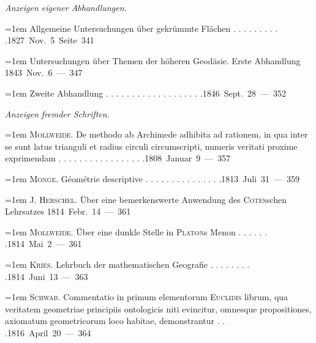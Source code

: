 \par{}%
\begingroup\fontsize{10.5}{13}\selectfont{}
\par\medskip{}
\noindent\textit{Anzeigen eigener Abhandlungen.}\par
\par\noindent\hangindent=1em Allgemeine Untersuchungen über gekrümmte Flächen . . . . . . . . . .\hfill{}\hbox{}\nobreak\hfill\mbox{1827 Nov. 5 Seite 341}\par
\par\noindent\hangindent=1em Untersuchungen über Themen der höheren Geodäsie. Erste Abhandlung \hfill{}\hbox{}\nobreak\hfill\mbox{1843 Nov. 6 — 347}\par
\par\noindent\hangindent=1em Zweite Abhandlung . . . . . . . . . . . . . . . . . . .\hfill{}\hbox{}\nobreak\hfill\mbox{1846 Sept. 28 — 352}\par
\par\medskip{}
\noindent\textit{Anzeigen fremder Schriften.}\par
\par\noindent\hangindent=1em \textsc{Mollweide}. De methodo ab Archimede adhibita ad rationem, in qua inter se sunt latus trianguli et radius circuli circumscripti, numeris veritati proxime exprimendam . . . . . . . . . . . . . . . . .\hfill{}\hbox{}\nobreak\hfill\mbox{1808 Januar 9 — 357}\par
\par\noindent\hangindent=1em \textsc{Monge}. Géométrie descriptive . . . . . . . . . . . . . . .\hfill{}\hbox{}\nobreak\hfill\mbox{1813 Juli 31 — 359}\par
\par\noindent\hangindent=1em J. \textsc{Herschel}. Über eine bemerkenswerte Anwendung des \textsc{Cotes}schen Lehrsatzes \hfill{}\hbox{}\nobreak\hfill\mbox{1814 Febr. 14 — 361}\par
\par\noindent\hangindent=1em \textsc{Mollweide}. Über eine dunkle Stelle in \textsc{Platon}s Menon . . . . . . .\hfill{}\hbox{}\nobreak\hfill\mbox{1814 Mai 2 — 361}\par
\par\noindent\hangindent=1em \textsc{Kries}. Lehrbuch der mathematischen Geografie . . . . . . . . .\hfill{}\hbox{}\nobreak\hfill\mbox{1814 Juni 13 — 363}\par
\par\noindent\hangindent=1em \textsc{Schwab}. Commentatio in primum elementorum \textsc{Euclidis} librum, qua veritatem geometriae principiis ontologicis niti evincitur, omnesque propositiones, axiomatum geometricorum loco habitae, demonstrantur . . .\hfill{}\hbox{}\nobreak\hfill\mbox{1816 April 20 — 364}\par
